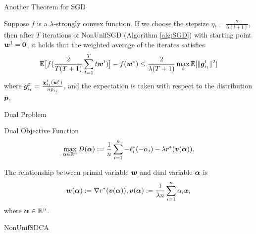 \begin{frame}{Another Theorem for SGD}
\begin{theorem}\label{theorem:weightedSGD}
    Suppose $f$ is a $\lambda$-strongly convex function. If we choose the stepsize $\eta_t=\frac{2}{\lambda (t+1)}$, then after $T$ iterations of NonUnifSGD (Algorithm \ref{alg:SGD}) with starting point $\bm{w}^{1}=\bm{0}$, it holds that the weighted average of the iterates satisfies
    \[
        \mathbb{E}\big[f(\frac{2}{T(T+1)}\sum_{t=1}^{T}t \bm{w}^{t})\big] - f(\bm{w}^*) \le 
        \frac{2}{\lambda(T+1)} \max_{t} \mathbb{E}[\|\bm{g}_{i_t}^t\|^2]
    \]
    where $\bm{g}_{i_t}^t=\frac{\bm{\chi}_{i_t}^t(\bm{w}^{t})}{np_{i_t}}$,
    and the expectation is taken with respect to the distribution $\bm{p}$.
\end{theorem}
\end{frame}

\begin{frame}{Dual Problem}
\begin{block}{Dual Objective Function}
\begin{equation*}\label{eq:dual}
\max_{\bm{\alpha}\in \mathbb{R}^n} D(\bm{\alpha}):=\frac1n \sum_{i=1}^n -\ell_i^*(-\alpha_i) - \lambda r^*(\bm{v}(\bm{\alpha})).  
\end{equation*}
\end{block}
The relationship between primal variable $\bm{w}$ and dual variable $\bm{\alpha}$ is
\begin{equation*}\label{eq:wdualupdate}
    \bm{w}(\bm{\alpha}) := \nabla r^*(\bm{v}(\bm{\alpha})), \bm{v}(\bm{\alpha}):=\frac{1}{\lambda n} \sum_{i=1}^n \alpha_i\bm{x}_i
\end{equation*}
where $\bm{\alpha}\in \mathbb{R}^n$.
\end{frame}

\begin{frame}{NonUnifSDCA}
\begin{algorithm}[H]
    \label{alg:SDCA}
    \caption{Non-Uniform Stochastic Dual Coordinate Ascent}
    \SetAlgoLined
\end{algorithm}
\end{frame}
